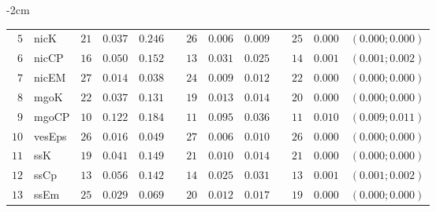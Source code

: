 \begin{table*}[!htbp]
\begin{adjustwidth*}{}{-2cm}
\begin{tabular}{@{}rlrrrrrrrrrcc@{}}
\footnotesize{$5 $} & \footnotesize{nicK     } & \footnotesize{$21$} & \footnotesize{$0.037$} & \footnotesize{$0.246$} && \footnotesize{$26$} & \footnotesize{$0.006$} & \footnotesize{$0.009$} && \footnotesize{$25$} & \footnotesize{$0.000$} & \footnotesize{$(0.000;0.000)$} \\
\footnotesize{$6 $} & \footnotesize{nicCP    } & \footnotesize{$16$} & \footnotesize{$0.050$} & \footnotesize{$0.152$} && \footnotesize{$13$} & \footnotesize{$0.031$} & \footnotesize{$0.025$} && \footnotesize{$14$} & \footnotesize{$0.001$} & \footnotesize{$(0.001;0.002)$} \\
\footnotesize{$7 $} & \footnotesize{nicEM    } & \footnotesize{$27$} & \footnotesize{$0.014$} & \footnotesize{$0.038$} && \footnotesize{$24$} & \footnotesize{$0.009$} & \footnotesize{$0.012$} && \footnotesize{$22$} & \footnotesize{$0.000$} & \footnotesize{$(0.000;0.000)$} \\
\footnotesize{$8 $} & \footnotesize{mgoK     } & \footnotesize{$22$} & \footnotesize{$0.037$} & \footnotesize{$0.131$} && \footnotesize{$19$} & \footnotesize{$0.013$} & \footnotesize{$0.014$} && \footnotesize{$20$} & \footnotesize{$0.000$} & \footnotesize{$(0.000;0.000)$} \\
\footnotesize{$9 $} & \footnotesize{mgoCP    } & \footnotesize{$10$} & \footnotesize{$0.122$} & \footnotesize{$0.184$} && \footnotesize{$11$} & \footnotesize{$0.095$} & \footnotesize{$0.036$} && \footnotesize{$11$} & \footnotesize{$0.010$} & \footnotesize{$(0.009;0.011)$} \\
\footnotesize{$10$} & \footnotesize{vesEps   } & \footnotesize{$26$} & \footnotesize{$0.016$} & \footnotesize{$0.049$} && \footnotesize{$27$} & \footnotesize{$0.006$} & \footnotesize{$0.010$} && \footnotesize{$26$} & \footnotesize{$0.000$} & \footnotesize{$(0.000;0.000)$} \\
\footnotesize{$11$} & \footnotesize{ssK      } & \footnotesize{$19$} & \footnotesize{$0.041$} & \footnotesize{$0.149$} && \footnotesize{$21$} & \footnotesize{$0.010$} & \footnotesize{$0.014$} && \footnotesize{$21$} & \footnotesize{$0.000$} & \footnotesize{$(0.000;0.000)$} \\
\footnotesize{$12$} & \footnotesize{ssCp     } & \footnotesize{$13$} & \footnotesize{$0.056$} & \footnotesize{$0.142$} && \footnotesize{$14$} & \footnotesize{$0.025$} & \footnotesize{$0.031$} && \footnotesize{$13$} & \footnotesize{$0.001$} & \footnotesize{$(0.001;0.002)$} \\
\footnotesize{$13$} & \footnotesize{ssEm     } & \footnotesize{$25$} & \footnotesize{$0.029$} & \footnotesize{$0.069$} && \footnotesize{$20$} & \footnotesize{$0.012$} & \footnotesize{$0.017$} && \footnotesize{$19$} & \footnotesize{$0.000$} & \footnotesize{$(0.000;0.000)$} \\

\end{tabular}
\end{adjustwidth*}
\end{table*}
